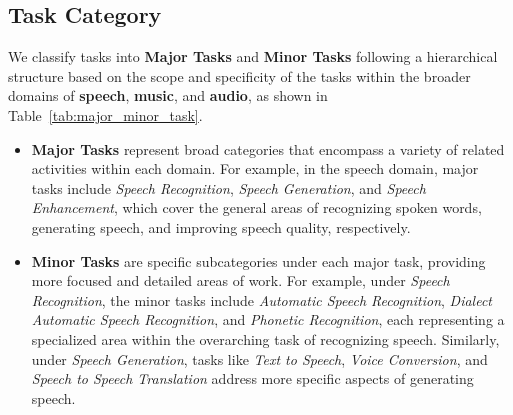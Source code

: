 \subsection{Task Category}
We classify tasks into \textbf{Major Tasks} and \textbf{Minor Tasks} following a hierarchical structure based on the scope and specificity of the tasks within the broader domains of \textbf{speech}, \textbf{music}, and \textbf{audio}, as shown in Table~\ref{tab:major_minor_task}. 
\begin{itemize}
    \item \textbf{Major Tasks} represent broad categories that encompass a variety of related activities within each domain. For example, in the speech domain, major tasks include \textit{Speech Recognition}, \textit{Speech Generation}, and \textit{Speech Enhancement}, which cover the general areas of recognizing spoken words, generating speech, and improving speech quality, respectively.
    \item \textbf{Minor Tasks} are specific subcategories under each major task, providing more focused and detailed areas of work. For example, under \textit{Speech Recognition}, the minor tasks include \textit{Automatic Speech Recognition}, \textit{Dialect Automatic Speech Recognition}, and \textit{Phonetic Recognition}, each representing a specialized area within the overarching task of recognizing speech. Similarly, under \textit{Speech Generation}, tasks like \textit{Text to Speech}, \textit{Voice Conversion}, and \textit{Speech to Speech Translation} address more specific aspects of generating speech.
\end{itemize}


